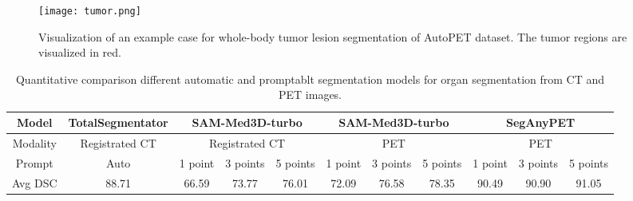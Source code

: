 \begin{figure*}[t]
    \centering
	\texttt{[image: tumor.png]}
	\caption{Visualization of an example case for whole-body tumor lesion segmentation of AutoPET dataset. The tumor regions are visualized in red.}
    \label{tumor_vis}
\end{figure*}



\begin{table*}[h]
\centering
\setlength\tabcolsep{4pt}
\renewcommand\arraystretch{1.4}
\begin{tabular}{c|c|ccc|ccc|ccc}
\hline
Model & TotalSegmentator \cite{wasserthal2023totalsegmentator} & \multicolumn{3}{c}{SAM-Med3D-turbo} & \multicolumn{3}{|c}{SAM-Med3D-turbo} & \multicolumn{3}{|c}{SegAnyPET} \\ \hline
Modality & Registrated CT & \multicolumn{3}{c|}{Registrated CT} & \multicolumn{3}{c|}{PET} & \multicolumn{3}{c}{PET} \\ \hline
Prompt & Auto & 1 point & 3 points & 5 points & 1 point & 3 points & 5 points & 1 point & 3 points & 5 points \\ \hline
Avg DSC & 88.71 & 66.59 & 73.77 & 76.01 & 72.09 & 76.58 & 78.35 & 90.49 & 90.90 & 91.05\\
\hline
\end{tabular}
	\caption{Quantitative comparison different automatic and promptablt segmentation models for organ segmentation from CT and PET images.} \label{Table_CT}
\end{table*}






